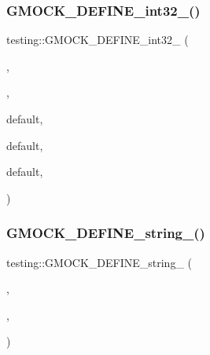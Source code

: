 \mbox{\label{namespacetesting_a211b4be008f5b4cccee486a262d91a52}} 
\subsubsection{\texorpdfstring{GMOCK\_DEFINE\_int32\_()}{GMOCK\_DEFINE\_int32\_()}}
{\footnotesize\ttfamily testing\+::\+G\+M\+O\+C\+K\+\_\+\+D\+E\+F\+I\+N\+E\+\_\+int32\+\_\+ (\begin{DoxyParamCaption}\item[{default\+\_\+mock\+\_\+behavior}]{,  }\item[{1}]{,  }\item[{\char`\"{}Controls the default behavior of mocks.\char`\"{} \char`\"{} Valid values\+:\textbackslash{}n\char`\"{} \char`\"{} 0 -\/ by}]{default,  }\item[{mocks act as Nice\+Mocks.\textbackslash{}n\char`\"{} \char`\"{} 1 -\/ by}]{default,  }\item[{mocks act as Naggy\+Mocks.\textbackslash{}n\char`\"{} \char`\"{} 2 -\/ by}]{default,  }\item[{mocks act as Strict\+Mocks.\char`\"{}}]{ }\end{DoxyParamCaption})}

\mbox{\label{namespacetesting_a92ea84a47432512152022ef73176676f}} 
\subsubsection{\texorpdfstring{GMOCK\_DEFINE\_string\_()}{GMOCK\_DEFINE\_string\_()}}
{\footnotesize\ttfamily testing\+::\+G\+M\+O\+C\+K\+\_\+\+D\+E\+F\+I\+N\+E\+\_\+string\+\_\+ (\begin{DoxyParamCaption}\item[{verbose}]{,  }\item[{\mbox{\hyperlink{namespacetesting_1_1internal_aa5e3dfc43abf98b8fa8aa864cd208103}{internal\+::k\+Warning\+Verbosity}}}]{,  }\item[{\char`\"{}Controls how verbose Google \mbox{\hyperlink{class_mock}{Mock}}\textquotesingle{}s output is.\char`\"{} \char`\"{} Valid values\+:\textbackslash{}n\char`\"{} \char`\"{} info -\/ prints all messages.\textbackslash{}n\char`\"{} \char`\"{} warning -\/ prints warnings and errors.\textbackslash{}n\char`\"{} \char`\"{} error -\/ prints errors only.\char`\"{}}]{ }\end{DoxyParamCaption})}

